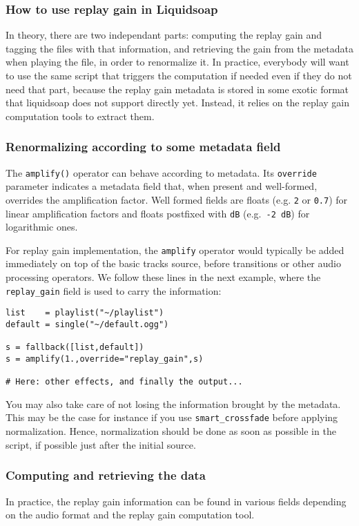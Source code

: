 \documentclass{book}
\newcommand{\eg}{e.g.~}
\begin{document}
\subsubsection{How to use replay gain in Liquidsoap}
In theory, there are two independant parts: computing the replay gain and
tagging the files with that information, and retrieving the gain from the
metadata when playing the file, in order to renormalize it. In practice,
everybody will want to use the same script that triggers the computation if
needed even if they do not need that part, because the replay gain metadata is
stored in some exotic format that liquidsoap does not support directly
yet. Instead, it relies on the replay gain computation tools to extract them.

\subsubsection{Renormalizing according to some metadata field}
The \verb+amplify()+ operator can behave according to metadata. Its
\verb+override+ parameter indicates a metadata field that, when present and
well-formed, overrides the amplification factor. Well formed fields are floats
(e.g. \verb+2+ or \verb+0.7+) for linear amplification factors and floats
postfixed with \verb+dB+ (\eg \verb+-2 dB+) for logarithmic ones.

For replay gain implementation, the \verb+amplify+ operator would typically be
added immediately on top of the basic tracks source, before transitions or other
audio processing operators. We follow these lines in the next example, where the
\verb+replay_gain+ field is used to carry the information:
\begin{verbatim}
list    = playlist("~/playlist")
default = single("~/default.ogg")

s = fallback([list,default])
s = amplify(1.,override="replay_gain",s)

# Here: other effects, and finally the output...
\end{verbatim}
You may also take care of not losing the information brought by the
metadata. This may be the case for instance if you use \verb+smart_crossfade+
before applying normalization. Hence, normalization should be done as soon as
possible in the script, if possible just after the initial source.

\subsubsection{Computing and retrieving the data}
In practice, the replay gain information can be found in various fields
depending on the audio format and the replay gain computation tool.
\end{document}
